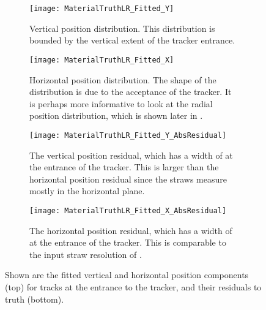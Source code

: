     \begin{figure}
    \centering
        \begin{subfigure}[t]{0.45\textwidth}
            \centering
            \texttt{[image: MaterialTruthLR\_Fitted\_Y]}
            \caption{Vertical position distribution. This distribution is bounded by the vertical extent of the tracker entrance.}
        \end{subfigure}
        \hspace{5mm}
        \begin{subfigure}[t]{0.45\textwidth}
            \centering
            \texttt{[image: MaterialTruthLR\_Fitted\_X]}
            \caption{Horizontal position distribution. The shape of the distribution is due to the acceptance of the tracker. It is perhaps more informative to look at the radial position distribution, which is shown later in .}
        \end{subfigure}
        \vspace{2mm}
        \begin{subfigure}[t]{0.45\textwidth}
            \centering
            \texttt{[image: MaterialTruthLR\_Fitted\_Y\_AbsResidual]}
            \caption{The vertical position residual, which has a width of  at the entrance of the tracker. This is larger than the horizontal position residual since the straws measure mostly in the horizontal plane.}
        \end{subfigure}%
        \hspace{5mm}
        \begin{subfigure}[t]{0.45\textwidth}
            \centering
            \texttt{[image: MaterialTruthLR\_Fitted\_X\_AbsResidual]}
            \caption{The horizontal position residual, which has a width of  at the entrance of the tracker. This is comparable to the input straw resolution of .}
        \end{subfigure}%
    \caption[Fitted track vertical and horizontal positions and corresponding residuals to truth]{Shown are the fitted vertical and horizontal position components (top) for tracks at the entrance to the tracker, and their residuals to truth (bottom).}
    \label{fig:MaterialFittedPositionComponents}
    \end{figure}


\clearpage %


